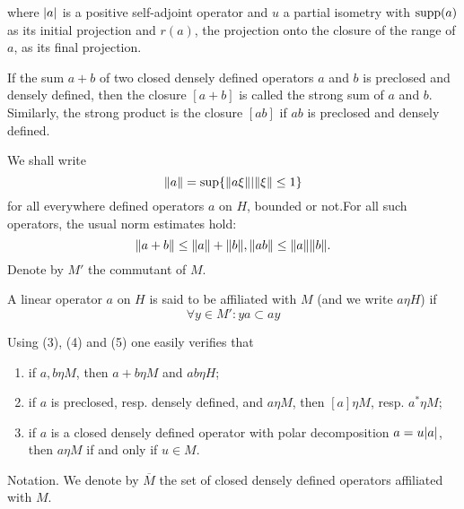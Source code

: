 where $\abs{a}$ is a positive self-adjoint operator and $u$ a partial isometry with $\operatorname{supp}(a)$ as its initial projection and $r(a)$, the projection onto the closure of the range of $a$, as its final projection.\par
If the sum $a+b$ of two closed densely defined operators $a$ and $b$ is preclosed and densely defined, then the closure $[a+b]$ is called the strong sum of $a$ and $b$. Similarly, the strong product is the closure $[ab]$ if $ab$ is preclosed and densely defined.\par
We shall write
\[
    \norm{a}=\sup\{\norm{a\xi}| \norm{\xi}\leq 1\}
\]
for all everywhere defined operators $a$ on $H$, bounded or not.For all such operators, the usual norm estimates hold:
\[
    \norm{a+b}\leq \norm{a}+\norm{b}, \norm{ab}\leq \norm{a}\norm{b}.
\]
Denote by $M'$ the commutant of $M$.\par
\begin{definition}
    A linear operator $a$ on $H$ is said to be affiliated with $M$ (and we write $a\eta H$) if
    \begin{equation}
        \forall y\in M':ya\subset ay
    \end{equation}
\end{definition}
\begin{remark}
    Using (3), (4) and (5) one easily verifies that
\end{remark}
\begin{enumerate}
    \item if $a,b\eta M$, then $a+b\eta M$ and $ab\eta H$;
    \item if $a$ is preclosed, resp. densely defined, and $a\eta M$, then $[a] \eta M$, resp. $a^*\eta M$;
    \item if $a$ is a closed densely defined operator with polar decomposition $a=u\abs{a}$, then $a\eta M$ if and only if $u\in M$.
\end{enumerate}
Notation. We denote by $\overline{M}$ the set of closed densely defined operators affiliated with $M$.\par

